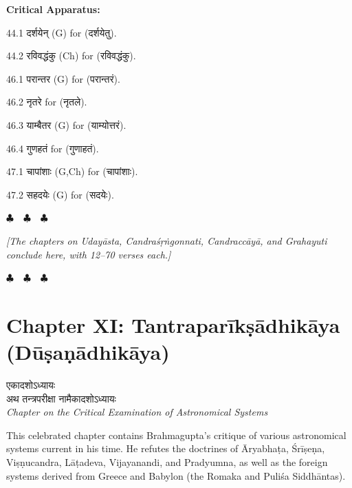 \documentclass[11pt,a4paper]{article}
\newcommand{\dev}[1]{{\devanagarifont #1}}
\newenvironment{variants}{%
  \small%
  \color{varecolor}%
  \list{}{\leftmargin=2em\itemindent=-1em}%
}{\endlist}
\newcommand{\chapterend}{%
  \begin{center}%
  \textcolor{endmarkcolor}{$\clubsuit$~~$\clubsuit$~~$\clubsuit$}%
  \end{center}%
}
\begin{document}
\vspace{0.4cm}
\textcolor{varecolor}{\textbf{Critical Apparatus:}}
\begin{variants}
\item[44.1] \dev{दर्शयेन्} (G) \dev{for} (\dev{दर्शयेतु}).
\item[44.2] \dev{रविवद्धंकु} (Ch) \dev{for} (\dev{रविवद्धंकु}).
\item[46.1] \dev{परान्तर} (G) \dev{for} (\dev{परान्तरं}).
\item[46.2] \dev{नृतरे} \dev{for} (\dev{नृतले}).
\item[46.3] \dev{याम्बैतर} (G) \dev{for} (\dev{याम्योत्तरं}).
\item[46.4] \dev{गुणहतं} \dev{for} (\dev{गुणाहतं}).
\item[47.1] \dev{चापांशाः} (G,Ch) \dev{for} (\dev{चापांशाः}).
\item[47.2] \dev{सहदयेः} (G) \dev{for} (\dev{सदयेः}).
\end{variants}

\vspace{0.5cm}
\chapterend
\textit{[The chapters on Udayāsta, Candraśṛṅgonnati, Candraccāyā, and Grahayuti
conclude here, with 12--70 verses each.]}
\chapterend

\newpage


\section*{Chapter XI: Tantraparīkṣādhikāya (Dūṣaṇādhikāya)}

\begin{center}
\dev{एकादशोऽध्यायः}\\[0.2cm]
\dev{अथ तन्त्रपरीक्षा नामैकादशोऽध्यायः}\\[0.3cm]
\textit{Chapter on the Critical Examination of Astronomical Systems}
\end{center}

This celebrated chapter contains Brahmagupta's critique of various astronomical
systems current in his time. He refutes the doctrines of Āryabhaṭa, Śrīṣeṇa,
Viṣṇucandra, Lāṭadeva, Vijayanandi, and Pradyumna, as well as the foreign systems
derived from Greece and Babylon (the Romaka and Puliśa Siddhāntas).
\end{document}
